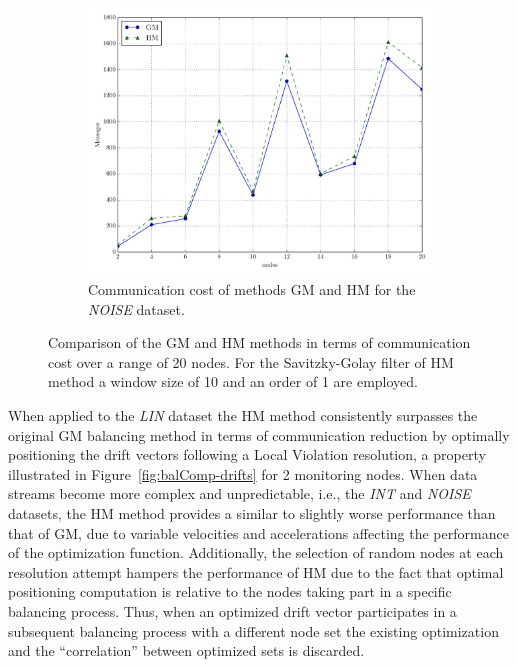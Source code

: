 \begin{figure}[!htb]
\begin{subfigure}{0.32\textwidth}%
  \includegraphics[width=\linewidth]{img/bal_msg_noisyinterweaving_nodes.pdf}
  \caption{Communication cost of methods GM and HM for the \emph{NOISE} dataset.}
\end{subfigure}
\vspace{0.5cm}
\caption{Comparison of the GM and HM methods in terms of communication cost over a range of 20 nodes. For the Savitzky-Golay filter of HM method a window size of 10 and an order of 1 are employed.} \label{fig:balComp-msgs}
\end{figure}

When applied to the \emph{LIN} dataset the HM method consistently surpasses the original GM balancing method in terms of communication reduction by optimally positioning the drift vectors following a Local Violation resolution, a property illustrated in Figure~\ref{fig:balComp-drifts} for 2 monitoring nodes. When data streams become more complex and unpredictable, i.e., the \emph{INT} and \emph{NOISE} datasets, the HM method provides a similar to slightly worse performance than that of GM, due to variable velocities and accelerations affecting the performance of the optimization function. Additionally, the selection of random nodes at each resolution attempt hampers the performance of HM due to the fact that optimal positioning computation is relative to the nodes taking part in a specific balancing process. Thus, when an optimized drift vector participates in a subsequent balancing process with a different node set the existing optimization and the ``correlation'' between optimized sets is discarded.

